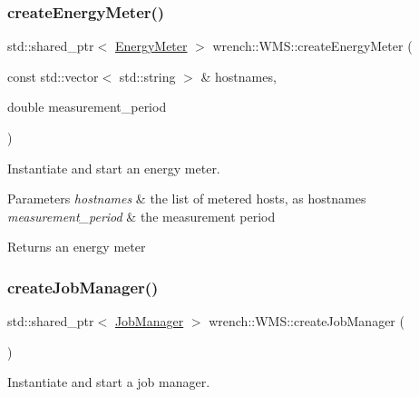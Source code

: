 \subsubsection{\texorpdfstring{create\+Energy\+Meter()}{createEnergyMeter()}\hspace{0.1cm}{\footnotesize\ttfamily [2/2]}}
{\footnotesize\ttfamily std\+::shared\+\_\+ptr$<$ \hyperlink{classwrench_1_1_energy_meter}{Energy\+Meter} $>$ wrench\+::\+W\+M\+S\+::create\+Energy\+Meter (\begin{DoxyParamCaption}\item[{const std\+::vector$<$ std\+::string $>$ \&}]{hostnames,  }\item[{double}]{measurement\+\_\+period }\end{DoxyParamCaption})\hspace{0.3cm}{\ttfamily [protected]}}



Instantiate and start an energy meter. 


\begin{DoxyParams}{Parameters}
{\em hostnames} & the list of metered hosts, as hostnames \\
\hline
{\em measurement\+\_\+period} & the measurement period \\
\hline
\end{DoxyParams}
\begin{DoxyReturn}{Returns}
an energy meter 
\end{DoxyReturn}
\mbox{\label{classwrench_1_1_w_m_s_a3f1a1451efda2a41d2d96a41cf229698}} 
\subsubsection{\texorpdfstring{create\+Job\+Manager()}{createJobManager()}}
{\footnotesize\ttfamily std\+::shared\+\_\+ptr$<$ \hyperlink{classwrench_1_1_job_manager}{Job\+Manager} $>$ wrench\+::\+W\+M\+S\+::create\+Job\+Manager (\begin{DoxyParamCaption}{ }\end{DoxyParamCaption})\hspace{0.3cm}{\ttfamily [protected]}}



Instantiate and start a job manager. 

